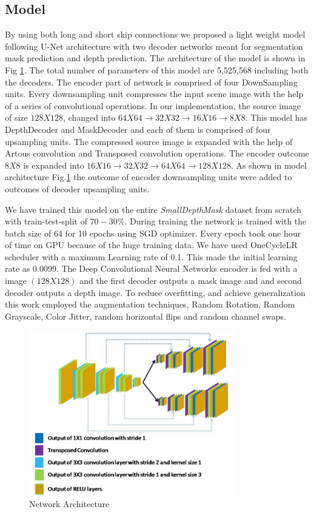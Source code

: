 \documentclass[review]{cvpr}
\begin{document}
\subsection{Model}
By using both long and short skip connections we proposed a light weight model following U-Net architecture with two decoder networks meant for segmentation mask prediction and depth prediction. The architecture of the model is shown in Fig \ref{fig:modelarch}. The total number of parameters of this model are 5,525,568 including both the decoders. The encoder part of network is comprised of four DownSampling units. Every downsampling unit compresses the input scene image with the help of a series of convolutional operations. In our implementation, the source image of size $128 X 128$, changed into $64X64 \rightarrow 32X32 \rightarrow  16X16 \rightarrow 8X8$. This model has DepthDecoder and MaskDecoder and each of them is comprised of four upsampling units. The compressed source image is expanded with the help of Artous convolution and Transposed convolution operations. The encoder outcome $8 X 8$ is expanded into $16X16 \rightarrow 32X32 \rightarrow 64X64 \rightarrow 128X128$. As shown in model architecture Fig.\ref{fig:modelarch} the outcome of encoder downsampling units were added to outcomes of decoder upsampling units.

We have trained this model on the entire \textit{SmallDepthMask} dataset from scratch with train-test-split of $70-30\%$. 
During training the network is trained with the batch size of 64 for 10 epochs using SGD optimizer\cite{bottou2010large}. Every epoch took one hour of time on GPU because of the huge training data.
We have used OneCycleLR scheduler \cite{smith2018disciplined} with a maximum Learning rate of 0.1. 
This made the initial learning rate as 0.0099.
The Deep Convolutional Neural Networks encoder is fed with a image $(128 X 128)$ and the first decoder outputs a mask 
image and and second decoder outputs a depth image. To reduce overfitting\cite{perez2017effectiveness}, and achieve generalization
this work employed the augmentation techniques, Random Rotation, Random Grayscale, Color Jitter, random horizontal flips and random channel swaps. 

\begin{figure}
\centering
  \includegraphics[width=0.8\textwidth]{networkarchitecture.jpg}
  \caption{Network Architecture}
  \label{fig:modelarch}
\end{figure}
\end{document}
